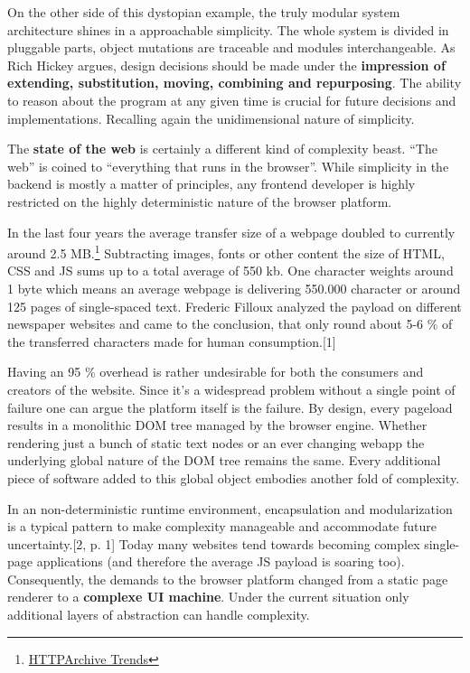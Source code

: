 \documentclass[]{assets/latex/ieee}
\begin{document}
On the other side of this dystopian example, the truly modular system
architecture shines in a approachable simplicity. The whole system is
divided in pluggable parts, object mutations are traceable and modules
interchangeable. As Rich Hickey argues, design decisions should be made
under the \textbf{impression of extending, substitution, moving,
combining and repurposing}. The ability to reason about the program at
any given time is crucial for future decisions and implementations.
Recalling again the unidimensional nature of simplicity.

The \textbf{state of the web} is certainly a different kind of
complexity beast. ``The web'' is coined to ``everything that runs in the
browser''. While simplicity in the backend is mostly a matter of
principles, any frontend developer is highly restricted on the highly
deterministic nature of the browser platform.

In the last four years the average transfer size of a webpage doubled to
currently around 2.5 MB.\footnote{\href{http://httparchive.org/trends.php}{HTTPArchive
  Trends}} Subtracting images, fonts or other content the size of HTML,
CSS and JS sums up to a total average of 550 kb. One character weights
around 1 byte which means an average webpage is delivering 550.000
character or around 125 pages of single-spaced text. Frederic Filloux
analyzed the payload on different newspaper websites and came to the
conclusion, that only round about 5-6 \% of the transferred characters
made for human consumption.{[}1{]}

Having an 95 \% overhead is rather undesirable for both the consumers
and creators of the website. Since it's a widespread problem without a
single point of failure one can argue the platform itself is the
failure. By design, every pageload results in a monolithic DOM tree
managed by the browser engine. Whether rendering just a bunch of static
text nodes or an ever changing webapp the underlying global nature of
the DOM tree remains the same. Every additional piece of software added
to this global object embodies another fold of complexity.

In an non-deterministic runtime environment, encapsulation and
modularization is a typical pattern to make complexity manageable and
accommodate future uncertainty.{[}2, p. 1{]} Today many websites tend
towards becoming complex single-page applications (and therefore the
average JS payload is soaring too). Consequently, the demands to the
browser platform changed from a static page renderer to a
\textbf{complexe UI machine}. Under the current situation only
additional layers of abstraction can handle complexity.
\end{document}
